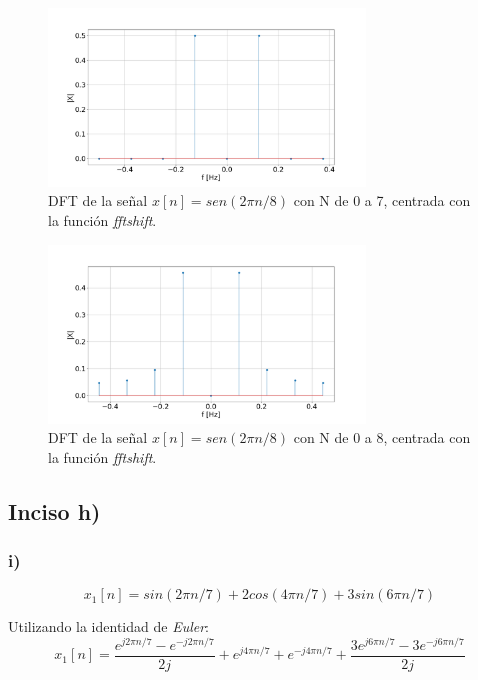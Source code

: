 \documentclass{article}
\begin{document}
\begin{figure}[H]
\centering
\includegraphics[width=0.75\textwidth]{Img/punto_1_g_a.png}
\caption{DFT de la señal $x[n]=sen(2 \pi n /8)$ con N de 0 a 7, centrada con la función \textit{fftshift}.}
\label{fig.1g}
\end{figure}

\begin{figure}[H]
\centering
\includegraphics[width=0.75\textwidth]{Img/punto_1_g_b.png}
\caption{DFT de la señal $x[n]=sen(2 \pi n /8)$ con N de 0 a 8, centrada con la función \textit{fftshift}.}
\label{fig.2g}
\end{figure}



\subsection*{Inciso h)}



\subsubsection*{i)}

\begin{equation}
    x_1[n]= sin(2\pi n/7) + 2cos(4 \pi n /7) + 3sin(6\pi n/7)
\end{equation}


Utilizando la identidad de \textit{Euler}:
\begin{equation}
    x_1[n]= \frac{e^{j2\pi n/7} - e^{-j2\pi n/7} }{2j} +  e^{j4\pi n/7} + e^{-j4\pi n/7} + \frac{3e^{j6\pi n/7} - 3e^{-j6\pi n/7} }{2j}
\end{equation}
\end{document}
